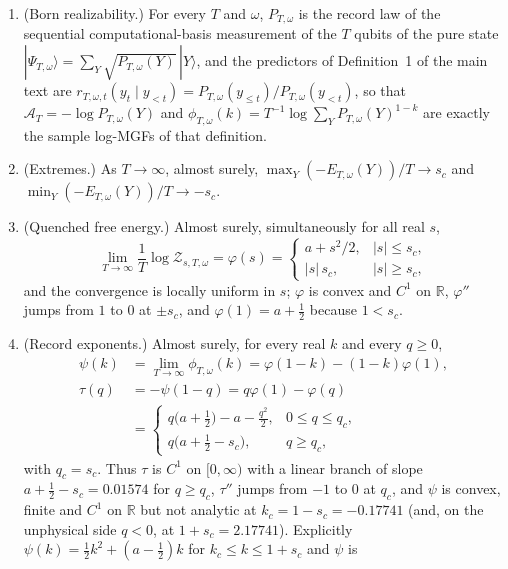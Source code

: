 \documentclass[aps,prx,reprint,superscriptaddress,nobibnotes,longbibliography]{revtex4-2}
\begin{document}
\begin{enumerate}
\item[(i)] (Born realizability.)  For every $T$ and $\omega$,
$P_{T,\omega}$ is the record law of the sequential computational-basis
measurement of the $T$ qubits of the pure state
$|\Psi_{T,\omega}\rangle=\sum_Y\sqrt{P_{T,\omega}(Y)}\,|Y\rangle$, and
the predictors of Definition~1 of the main text are
$r_{T,\omega,t}(y_t\mid y_{<t})=P_{T,\omega}(y_{\le t})/P_{T,\omega}(y_{<t})$,
so that $\mathcal A_T=-\log P_{T,\omega}(Y)$ and
$\phi_{T,\omega}(k)=T^{-1}\log\sum_YP_{T,\omega}(Y)^{1-k}$ are exactly
the sample log-MGFs of that definition.
\item[(ii)] (Extremes.)  As $T\to\infty$, almost surely,
$\max_Y(-E_{T,\omega}(Y))/T\to s_c$ and
$\min_Y(-E_{T,\omega}(Y))/T\to-s_c$.
\item[(iii)] (Quenched free energy.)  Almost surely, simultaneously for
all real $s$,
\begin{equation}
 \lim_{T\to\infty}\frac1T\log\mathcal Z_{s,T,\omega}=\varphi(s)=
 \begin{cases}a+s^2/2,&|s|\le s_c,\\ |s|\,s_c,&|s|\ge s_c,\end{cases}
 \label{eqS:remphi}
\end{equation}
and the convergence is locally uniform in $s$; $\varphi$ is convex and
$C^1$ on $\mathbb R$, $\varphi''$ jumps from $1$ to $0$ at $\pm s_c$,
and $\varphi(1)=a+\tfrac12$ because $1<s_c$.
\item[(iv)] (Record exponents.)  Almost surely, for every real $k$ and
every $q\ge0$,
\begin{align}
 \psi(k)&=\lim_{T\to\infty}\phi_{T,\omega}(k)=\varphi(1-k)-(1-k)\varphi(1),\label{eqS:rempsi}\\
 \tau(q)&=-\psi(1-q)=q\varphi(1)-\varphi(q)\nonumber\\
 &=\begin{cases}q\bigl(a+\tfrac12\bigr)-a-\tfrac{q^2}2,&0\le q\le q_c,\\[2pt]
 q\bigl(a+\tfrac12-s_c\bigr),&q\ge q_c,\end{cases}
 \label{eqS:remtau}
\end{align}
with $q_c=s_c$.  Thus $\tau$ is $C^1$ on $[0,\infty)$ with a linear
branch of slope $a+\tfrac12-s_c=0.01574$ for $q\ge q_c$, $\tau''$ jumps
from $-1$ to $0$ at $q_c$, and $\psi$ is convex, finite and $C^1$ on
$\mathbb R$ but not analytic at $k_c=1-s_c=-0.17741$ (and, on the
unphysical side $q<0$, at $1+s_c=2.17741$).  Explicitly
$\psi(k)=\tfrac12k^2+(a-\tfrac12)k$ for $k_c\le k\le1+s_c$ and $\psi$ is

\end{enumerate}
\end{document}
